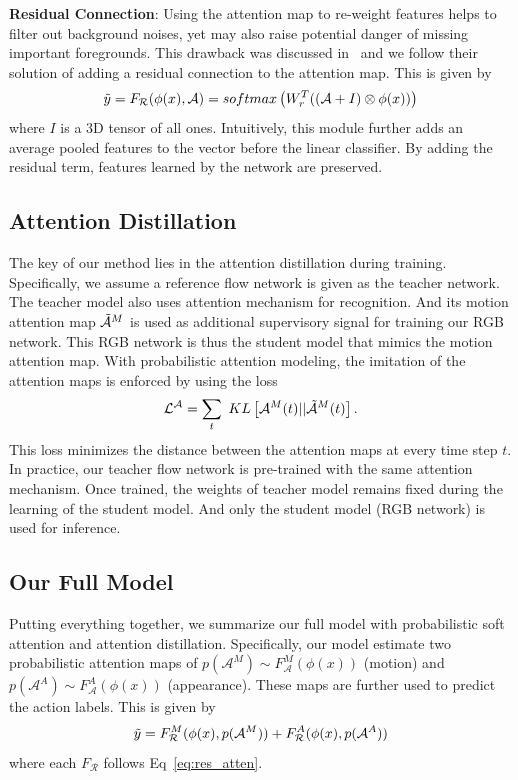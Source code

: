 \documentclass[10pt,twocolumn,letterpaper]{article}
\begin{document}
\noindent \textbf{Residual Connection}: Using the attention map to re-weight features helps to filter out background noises, yet may also raise potential danger of missing important foregrounds. This drawback was discussed in~\cite{wang2017residual} and we follow their solution of adding a residual connection to the attention map. This is given by 
\begin{equation}
\label{eq:res_atten}
\small
    \Tilde{y} = F_{\mathcal{R}}(\phi(x), \mathcal{A}) = softmax\left( W_r^T ( (\mathcal{A}+I) \otimes \phi(x) ) \right)
\end{equation}
where $I$ is a 3D tensor of all ones. Intuitively, this module further adds an average pooled features to the vector before the linear classifier. By adding the residual term, features learned by the network are preserved. 

\subsection{Attention Distillation}
The key of our method lies in the attention distillation during training. Specifically, we assume a reference flow network is given as the teacher network. The teacher model also uses attention mechanism for recognition. And its motion attention map $\mathcal{\Tilde{A}}^M$ is used as additional supervisory signal for training our RGB network. This RGB network is thus the student model that mimics the motion attention map. With probabilistic attention modeling, the imitation of the attention maps is enforced by using the loss
\begin{equation}
\label{eq:distill}
\small 
    \mathcal{L}^{\mathcal{A}} = \sum_t\  KL\left[ \mathcal{A}^M(t)||\mathcal{\Tilde{A}}^M(t) \right].
\end{equation}
This loss minimizes the distance between the attention maps at every time step $t$. In practice, our teacher flow network is pre-trained with the same attention mechanism. Once trained, the weights of teacher model remains fixed during the learning of the student model. And only the student model (RGB network) is used for inference. 

\subsection{Our Full Model}
Putting everything together, we summarize our full model with probabilistic soft attention and attention distillation. Specifically, our model estimate two probabilistic attention maps of $p(\mathcal{A}^M) \sim F_{\mathcal{A}}^M(\phi(x))$ (motion) and $p(\mathcal{A}^A) \sim F_{\mathcal{A}}^A(\phi(x))$ (appearance). These maps are further used to predict the action labels. This is given by 
\begin{equation}
\small
    \Tilde{y} = F_{\mathcal{R}}^M(\phi(x), p(\mathcal{A}^M)) + F_{\mathcal{R}}^A(\phi(x), p(\mathcal{A}^A))
\end{equation}
where each $F_{\mathcal{R}}$ follows Eq~\ref{eq:res_atten}.
\end{document}
